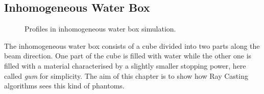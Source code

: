 \documentclass[12pt, a4paper, twoside]{book}
\begin{document}

\subsection{Inhomogeneous Water Box}\label{inhomo}

\begin{figure}[!b]
\centering
{}\quad
{}\quad
{}\quad
\caption{Profiles in inhomogeneous water box simulation.}
\label{fig:IP}
\end{figure}

The inhomogeneous water box consists of a cube divided into two parts along the beam direction. One part of the cube is filled with water while the other one is filled with a material characterised by a slightly smaller stopping power, here called \emph{gum} for simplicity. The aim of this chapter is to show how Ray Casting algorithms sees this kind of phantoms.
\end{document}
